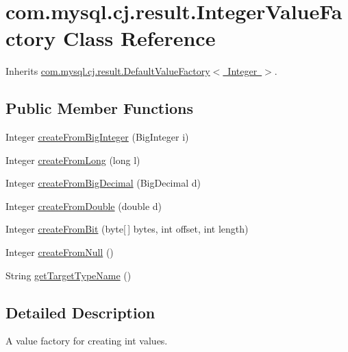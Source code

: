 \hypertarget{classcom_1_1mysql_1_1cj_1_1result_1_1_integer_value_factory}{}\section{com.\+mysql.\+cj.\+result.\+Integer\+Value\+Factory Class Reference}
\label{classcom_1_1mysql_1_1cj_1_1result_1_1_integer_value_factory}


Inherits \mbox{\hyperlink{classcom_1_1mysql_1_1cj_1_1result_1_1_default_value_factory}{com.\+mysql.\+cj.\+result.\+Default\+Value\+Factory$<$ Integer $>$}}.

\subsection*{Public Member Functions}
\begin{DoxyCompactItemize}
\item 
Integer \mbox{\hyperlink{classcom_1_1mysql_1_1cj_1_1result_1_1_integer_value_factory_afcaad654d1c819a9d5cb95702e462f13}{create\+From\+Big\+Integer}} (Big\+Integer i)
\item 
Integer \mbox{\hyperlink{classcom_1_1mysql_1_1cj_1_1result_1_1_integer_value_factory_a3336f8086f9c6f0dd4b646ee02dea5b0}{create\+From\+Long}} (long l)
\item 
Integer \mbox{\hyperlink{classcom_1_1mysql_1_1cj_1_1result_1_1_integer_value_factory_a6ba94e37c3fb2dd979ac41eb1707b95a}{create\+From\+Big\+Decimal}} (Big\+Decimal d)
\item 
Integer \mbox{\hyperlink{classcom_1_1mysql_1_1cj_1_1result_1_1_integer_value_factory_adb315fc6e975bb8daf76d5aa0c34a8f6}{create\+From\+Double}} (double d)
\item 
Integer \mbox{\hyperlink{classcom_1_1mysql_1_1cj_1_1result_1_1_integer_value_factory_ae388febb5e85b19f21ef5ba7527f038e}{create\+From\+Bit}} (byte\mbox{[}$\,$\mbox{]} bytes, int offset, int length)
\item 
Integer \mbox{\hyperlink{classcom_1_1mysql_1_1cj_1_1result_1_1_integer_value_factory_a1192fb5fbb0450406e0f1c68cf9f24a6}{create\+From\+Null}} ()
\item 
String \mbox{\hyperlink{classcom_1_1mysql_1_1cj_1_1result_1_1_integer_value_factory_a74ecafb69f253e4d3dc3cb0eab5a3efc}{get\+Target\+Type\+Name}} ()
\end{DoxyCompactItemize}


\subsection{Detailed Description}
A value factory for creating int values. 


